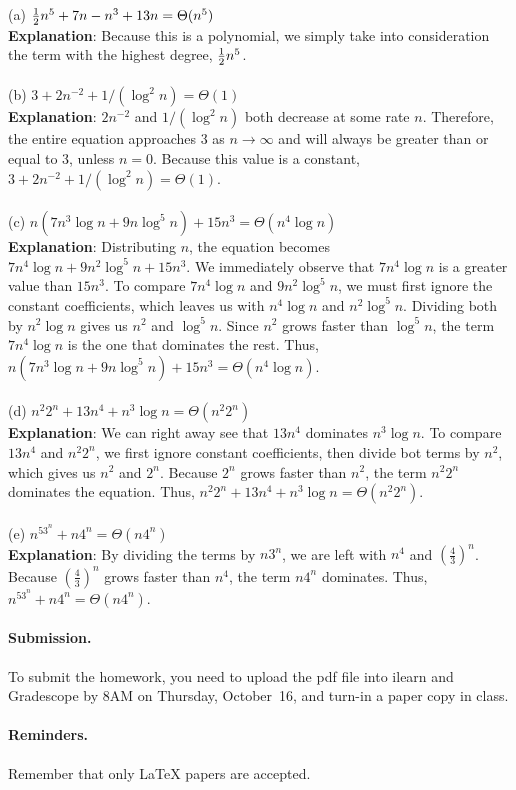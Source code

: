 \documentclass{article}
\begin{document}
\begin{problem}
\begin{solution}
\\
\\ (a) $\mbox{$\frac{1}{2}$} n^5 + 7n - n^3 + 13n = \Theta(n^5)$
\\ \textbf{Explanation}: Because this is a polynomial, we simply take into consideration the term with the highest degree, $\mbox{$\frac{1}{2}$} n^5$. \\
\\ (b)  $3 + 2n^{-2} + 1/(\log^2 n) = \Theta(1)$
\\ \textbf{Explanation}: $2n^{-2}$ and $1/(\log^2 n)$ both decrease at some rate $n$. Therefore, the entire equation approaches 3 as $n \rightarrow \infty$ and will always be greater than or equal to 3, unless $n = 0$.  Because this value is a constant, $3 + 2n^{-2} + 1/(\log^2 n) = \Theta(1)$. \\
\\ (c) $n ( 7n^3\log n + 9 n\log^5n) + 15n^3 = \Theta(n^4 \log n)$
\\ \textbf{Explanation}: Distributing $n$, the equation becomes $7n^4\log n + 9 n^2 \log^5n + 15n^3$. We immediately observe that $7n^4\log n$ is a greater value than $15n^3$. To compare $7n^4\log n$ and $9 n^2 \log^5n$, we must first ignore the constant coefficients, which leaves us with  $n^4\log n$ and $n^2 \log^5n$. Dividing both by $n^2 \log n$ gives us $n^2$ and $\log^5 n$. Since $n^2$ grows faster than $\log^5 n$, the term $7n^4\log n$ is the one that dominates the rest. Thus, $n ( 7n^3\log n + 9 n\log^5n) + 15n^3 = \Theta(n^4 \log n)$. \\
\\ (d)  $n^2 2^n + 13n^4 + n^3\log n = \Theta(n^2 2^n)$
\\ \textbf{Explanation}: We can right away see that $13n^4$ dominates $n^3\log n$. To compare  $13n^4$ and $n^2 2^n$, we first ignore constant coefficients, then divide bot terms by $n^2$, which gives us $n^2$ and $2^n$. Because $2^n$ grows faster than $n^2$, the term $n^2 2^n$ dominates the equation. Thus, $n^2 2^n + 13n^4 + n^3\log n = \Theta(n^2 2^n)$. \\
\\ (e) $n^53^n + n4^n = \Theta(n4^n)$ 
\\ \textbf{Explanation}: By dividing the terms by $n3^n$, we are left with $n^4$ and $(\frac{4}{3})^n$. Because $(\frac{4}{3})^n$ grows faster than $n^4$, the term $n4^n$ dominates. Thus, $n^53^n + n4^n = \Theta(n4^n)$.

\end{solution}

\end{problem}


\vskip 0.1in
\paragraph{Submission.}
To submit the homework, you need to upload the pdf file into ilearn and Gradescope by 8AM on Thursday, October~16,
and turn-in a paper copy in class.

\paragraph{Reminders.}
Remember that only {\LaTeX} papers are accepted. 
\end{document}
